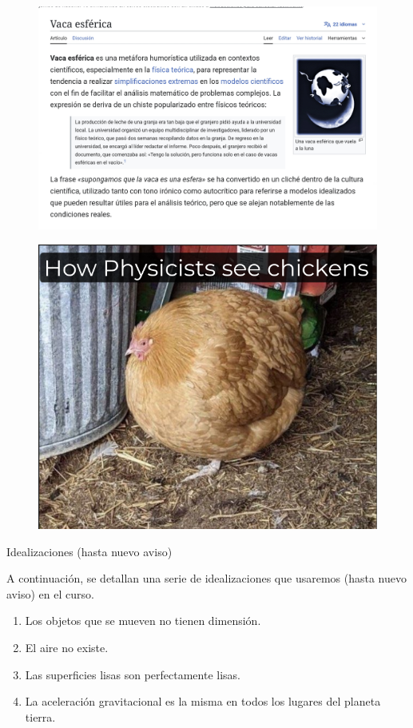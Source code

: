\begin{frame}
    \begin{figure}
        \centering
        \includegraphics[width=\linewidth]{figures/vaca-esferica.jpg}
    \end{figure}
\end{frame}

\begin{frame}
    \begin{figure}
        \centering
        \includegraphics[width=0.8\linewidth]{figures/spherical-chiken.png}
    \end{figure}
\end{frame}

\begin{frame}{Idealizaciones (hasta nuevo aviso)}

A continuación, se detallan una serie de idealizaciones que usaremos (hasta nuevo aviso) en el curso.

\begin{enumerate}
    \item Los objetos que se mueven no tienen dimensión.
    \item El aire no existe.
    \item Las superficies lisas son perfectamente lisas.
    \item La aceleración gravitacional es la misma en todos los lugares del planeta tierra.
\end{enumerate}

    
\end{frame}

